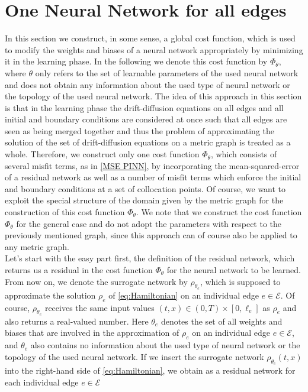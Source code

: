 \section{One Neural Network for all edges}
\label{ch3:sec1}

In this section we construct, in some sense, a global cost function, which is used to modify the weights and biases of a neural network appropriately by minimizing it in the learning phase. In the following we denote this cost function by $\Phi_\theta$, where $\theta$ only refers to the set of learnable parameters of the used neural network and does not obtain any information about the used type of neural network or the topology of the used neural network. The idea of this approach in this section is that in the learning phase the drift-diffusion equations on all edges and all initial and boundary conditions are considered at once such that all edges are seen as being merged together and thus the problem of approximating the solution of the set of drift-diffusion equations on a metric graph is treated as a whole. Therefore, we construct only one cost function $\Phi_\theta$, which consists of several misfit terms, as in \cref{MSE PINN}, by incorporating the mean-squared-error of a residual network as well as a number of misfit terms which enforce the initial and boundary conditions at a set of collocation points. Of course, we want to exploit the special structure of the domain given by the metric graph for the construction of this cost function $\Phi_\theta$. We note that we construct the cost function $\Phi_\theta$ for the general case and do not adopt the parameters with respect to the previously mentioned graph, since this approach can of course also be applied to any metric graph. \\
Let's start with the easy part first, the definition of the residual network, which returns us a residual in the cost function $\Phi_\theta$ for the neural network to be learned. From now on, we denote the surrogate network by $\rho_{\theta_e}$, which is supposed to approximate the solution $\rho_e$ of \cref{eq:Hamiltonian} on an individual edge $e \in \mathcal{E}$. Of course, $\rho_{\theta_e}$ receives the same input values $ \left( t, x \right) \in  \left( 0, T \right) \times [0, \ell_e]$ as $\rho_e$ and also returns a real-valued number. Here $\theta_e$ denotes the set of all weights and biases that are involved in the approximation of $\rho_e$ on an individual edge $e \in \mathcal{E}$, and $\theta_e$ also contains no information about the used type of neural network or the topology of the used neural network. If we insert the surrogate network $\rho_{\theta_e} \left( t,x \right)$ into the right-hand side of \cref{eq:Hamiltonian}, we obtain as a residual network for each individual edge $e \in \mathcal{E}$
